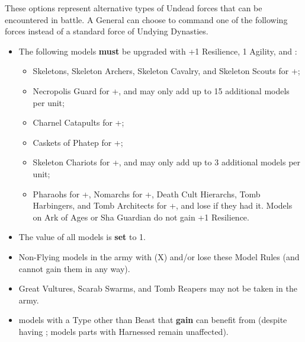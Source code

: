 

These options represent alternative types of Undead forces that can be encountered in battle. A \pharaoh{} General can choose to command one of the following forces instead of a standard force of Undying Dynasties.

\subtitle{\commanderoftheterracottaarmy}

\begin{itemize}
\item The following models \textbf{must} be upgraded with +1 Resilience, \minuss{}1 Agility, and \textbf{\ensouledstatue}:

\begin{itemize}
\item Skeletons, Skeleton Archers, Skeleton Cavalry, and Skeleton Scouts for +\permodel{};
\item Necropolis Guard for +\permodel{}, and may only add up to 15 additional models per unit;
\item Charnel Catapults for +\permodel{};
\item Caskets of Phatep for +\permodel{};
\item \rnf{} Skeleton Chariots for +\permodel{}, and may only add up to 3 additional models per unit;
\item Pharaohs for +\permodel{}, Nomarchs for +\permodel{}, Death Cult Hierarchs, Tomb Harbingers, and Tomb Architects for +\permodel{}, and lose \flammable{} if they had it. Models on Ark of Ages or Sha Guardian do not gain +1 Resilience.
\end{itemize}

\item The \resurrected{} value of all models is \textbf{set} to 1.

\item Non-Flying models in the army with \specialambush{} (X) and/or \lighttroops{} lose these Model Rules (and cannot gain them in any way).

\item Great Vultures, Scarab Swarms, and Tomb Reapers may not be taken in the army.

\item \rnf{} models with a Type other than Beast that \textbf{gain} \ensouledstatue{} can benefit from \undyingwill{} (despite having \ensouledstatue{}; models parts with Harnessed remain unaffected).
\end{itemize}

